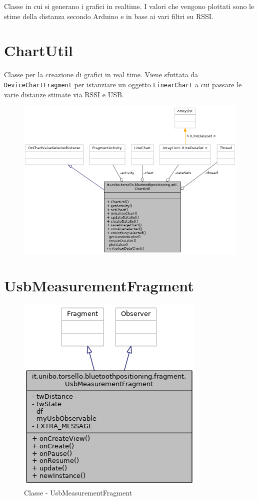 Classe in cui si generano i grafici in realtime. I valori che vengono plottati sono le stime della distanza secondo Arduino e in base ai vari filtri su RSSI.

\newpage
\section{ChartUtil}

Classe per la creazione di grafici in real time. Viene sfuttata da \texttt{DeviceChartFragment} per istanziare un oggetto \texttt{LinearChart} a cui passare le varie distanze stimate via RSSI e USB.
\begin{figure}[ph]
	\centering
	\includegraphics[width=1.2\linewidth]{img/uml/class/classit_1_1unibo_1_1torsello_1_1bluetoothpositioning_1_1util_1_1ChartUtil__coll__graph.png}
	\caption{}
\end{figure}

\newpage
\section{UsbMeasurementFragment}
\begin{figure}[ph]
	\centering
	\includegraphics[width=0.5\linewidth]{img/uml/class/classit_1_1unibo_1_1torsello_1_1bluetoothpositioning_1_1fragment_1_1UsbMeasurementFragment__inherit__graph.png}
	\caption{Classe - UsbMeasurementFragment}
\end{figure}

